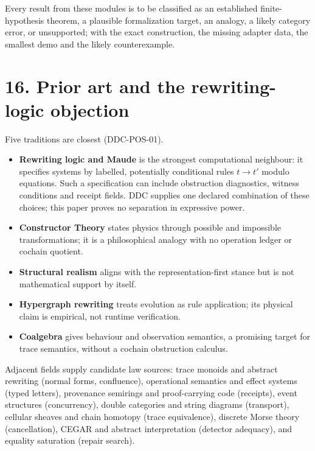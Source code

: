 \documentclass[
  11pt,
]{article}
\providecommand{\tightlist}{%
  \setlength{\itemsep}{0pt}\setlength{\parskip}{0pt}}
\renewcommand{\_}{\ddcunderscore\allowbreak}
\begin{document}
Every result from these modules is to be classified as an established
finite-hypothesis theorem, a plausible formalization target, an analogy,
a likely category error, or unsupported; with the exact construction,
the missing adapter data, the smallest demo and the likely
counterexample.

\section{16. Prior art and the rewriting-logic
objection}\label{prior-art-and-the-rewriting-logic-objection}

Five traditions are closest (DDC-POS-01).

\begin{itemize}
\tightlist
\item
  \textbf{Rewriting logic and Maude} is the strongest computational
  neighbour: it specifies systems by labelled, potentially conditional
  rules \(t \to t'\) modulo equations. Such a specification can include
  obstruction diagnostics, witness conditions and receipt fields. DDC
  supplies one declared combination of these choices; this paper proves
  no separation in expressive power.
\item
  \textbf{Constructor Theory} states physics through possible and
  impossible transformations; it is a philosophical analogy with no
  operation ledger or cochain quotient.
\item
  \textbf{Structural realism} aligns with the representation-first
  stance but is not mathematical support by itself.
\item
  \textbf{Hypergraph rewriting} treats evolution as rule application;
  its physical claim is empirical, not runtime verification.
\item
  \textbf{Coalgebra} gives behaviour and observation semantics, a
  promising target for trace semantics, without a cochain obstruction
  calculus.
\end{itemize}

Adjacent fields supply candidate law sources: trace monoids and abstract
rewriting (normal forms, confluence), operational semantics and effect
systems (typed letters), provenance semirings and proof-carrying code
(receipts), event structures (concurrency), double categories and string
diagrams (transport), cellular sheaves and chain homotopy (trace
equivalence), discrete Morse theory (cancellation), CEGAR and abstract
interpretation (detector adequacy), and equality saturation (repair
search).
\end{document}
